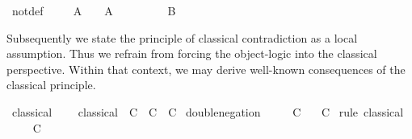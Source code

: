 \begin{isabellebody}
\ not{}def\ \isamarkupfalse%
\isanewline
\ \ \isamarkupfalse%
\ {}A\ {}\ {}{}\ \ {}A{}\ \isamarkupfalse%
\ {}\ \isamarkupfalse%
\isanewline
\ \ \isamarkupfalse%
\ \isamarkupfalse%
\ B\ \isamarkupfalse%
\isanewline
{}\isamarkupfalse%
%
\endisatagproof
{\isafoldproof}%
%
\isadelimproof
%
\endisadelimproof
%
\isamarkuptrue%
%
\begin{isamarkuptext}%
Subsequently we state the principle of classical contradiction as a
  local assumption.  Thus we refrain from forcing the object-logic
  into the classical perspective.  Within that context, we may derive
  well-known consequences of the classical principle.%
\end{isamarkuptext}%
\isamarkuptrue%
\isamarkupfalse%
\ classical\ {}\isanewline
\ \ \ classical{}\ {}{}{}\ C\ {}\ C{}\ {}\ C{}\isanewline
{}\isanewline
\isanewline
{}\isamarkupfalse%
\ double{}negation{}\isanewline
\ \ \ {}{}\ {}\ C{}\isanewline
\ \ \ C\isanewline
%
\isadelimproof
%
\endisadelimproof
%
\isatagproof
{}\isamarkupfalse%
\ {}rule\ classical{}\isanewline
\ \ \isamarkupfalse%
\ {}{}\ C{}\isanewline

\end{isabellebody}
